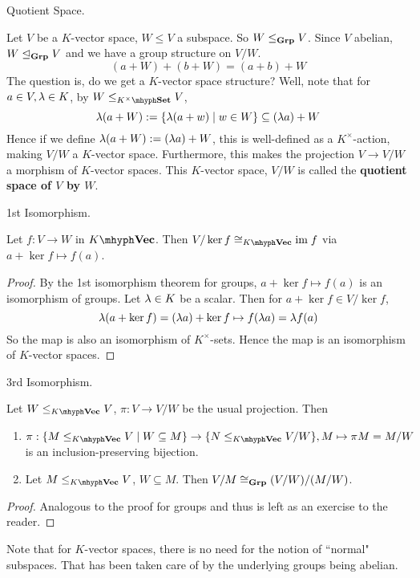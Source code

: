 \documentclass[../book.tex]{subfiles}
\begin{document}
\begin{dfn} Quotient Space.

    Let $V$ be a $K$-vector space, $W \leq V$ a subspace.
    So $W \leq_{\mathbf{Grp}} V$. 
    Since $V$ abelian, $W \trianglelefteq_{\mathbf{Grp}} V$ and we have a group structure on $V / W$.
    \[ 
        (a + W) + (b + W) = (a + b) + W
    \]
    The question is, do we get a $K$-vector space structure?
    Well, note that for $a \in V, \lambda \in K$, 
    by $W \leq_{K^\times\mhyph\Set} V$,
    \[\lambda (a + W) := \{\lambda(a + w) \mid w \in W\} \subseteq (\lambda a) + W\]
    Hence if we define $\lambda(a + W) := (\lambda a) + W$, 
    this is well-defined as a $K^\times$-action,
    making $V/W$ a $K$-vector space.
    Furthermore, this makes the projection $V \to V/W$ 
    a morphism of $K$-vector spaces. 
    This $K$-vector space, $V/W$ is called the \textbf{quotient space of $V$ by $W$}.
\end{dfn}
\begin{thm} 1st Isomorphism. 
    
    Let $f : V \to W$ in $\KVec$. 
    Then $V / \ker f \iso_{\KVec} \im f$ via $a + \ker f \mapsto f(a)$.
\end{thm}
\begin{proof}
    By the 1st isomorphism theorem for groups, 
    $a + \ker f \mapsto f(a)$ is an isomorphism of groups. 
    Let $\lambda \in K$ be a scalar. 
    Then for $a + \ker f \in V/\ker f$, 
    \[
        \lambda(a + \ker f) = (\lambda a) + \ker f \mapsto 
        f(\lambda a) = \lambda f(a)
    \]
    So the map is also an isomorphism of $K^\times$-sets.
    Hence the map is an isomorphism of $K$-vector spaces. 
\end{proof}
\begin{thm} 3rd Isomorphism. 

    Let $W \leq_{\KVec} V$, $\pi : V \to V/W$ be the usual projection. 
    Then 
    \begin{enumerate}
        \item $\pi : 
        \{M \leq_{\KVec} V \mid W \subseteq M\} \to \{N \leq_{\KVec} V/W\}, 
        M \mapsto \pi M = M/W$ is an inclusion-preserving bijection.
        \item Let $M \leq_{\KVec} V$, $W \subseteq M$. 
        Then $V / M \cong_{\mathbf{Grp}} (V / W) / (M / W)$. 
    \end{enumerate}
\end{thm}
\begin{proof}
    Analogous to the proof for groups
    and thus is left as an exercise to the reader. 
\end{proof}

\begin{rmk}
    Note that for $K$-vector spaces, there is no need 
    for the notion of ``normal" subspaces. 
    That has been taken care of by the underlying groups being abelian.
\end{rmk}

\end{document}
